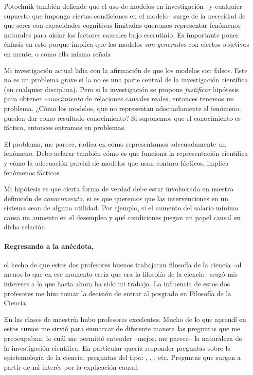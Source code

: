 Potochnik también defiende que el uso de modelos en investigación --y cualquier supuesto que imponga ciertas condiciones en el modelo-- surge de la necesidad de que seres con capacidades cognitivas limitadas queremos representar fenómenos naturales para aislar los factores causales bajo escrutinio.
Es importante poner énfasis en esto porque implica que los modelos \emph{son generados} con ciertos objetivos en mente, o como ella misma señala 

Mi investigación actual lidia con la afirmación de que los modelos son falsos.
Este no es un problema grave si la  no es una parte central de la investigación científica (en cualquier disciplina).
Pero si la investigación se propone \emph{justificar} hipótesis para obtener \emph{conocimiento} de relaciones causales reales, entonces tenemos un problema.
¿Cómo los modelos, que no representan adecuadamente el fenómeno, pueden dar como resultado conocimiento?
Si suponemos que el conocimiento es fáctico, entonces entramos en problemas.

El problema, me parece, radica en cómo representamos adecuadamente un fenómeno.
Debo aclarar también cómo es que funciona la representación científica y cómo la adecuación parcial de modelos que usan contara fácticos, implica fenómenos fácticos.

Mi hipótesis es que cierta forma de verdad debe estar involucrada en nuestra definición de \emph{conocimiento,} si es que queremos que las intervenciones en un sistema sean de alguna utilidad.
Por ejemplo, si el aumento del salario mínimo causa un aumento en el desempleo y qué condiciones juegan un papel causal en dicha relación.

\paragraph{Regresando a la anécdota,} el hecho de que estos dos profesores buenos trabajaran filosofía de la
ciencia --al menos lo que en ese momento creía que era la filosofía de la ciencia-- sesgó mis intereses a lo que hasta ahora ha sido mi trabajo.
La influencia de estos dos profesores me hizo tomar la decisión de entrar al posgrado en Filosofía de la Ciencia.

En las clases de maestría hubo profesores excelentes.
Mucho de lo que aprendí en estos cursos me sirvió para enmarcar de diferente manera las preguntas que me preocupaban, lo cuál me permitió entender --mejor, me parece-- la naturaleza de la investigación científica.
En particular quería responder preguntas sobre la epistemología de la ciencia, preguntas del tipo: , , , etc.
Preguntas que surgen a partir de mi interés por la explicación causal.

